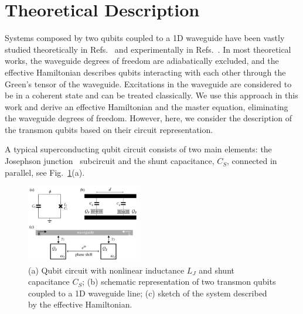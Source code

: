 \documentclass[lettersize,journal]{IEEEtran}
\begin{document}
\section{Theoretical Description}
\noindent Systems composed by two qubits coupled to a 1D waveguide have been vastly studied theoretically in Refs.~\cite{muller_nonreciprocal_2017, dai_rectification_2015, Nefedkin2022, trivedi_fano-qubits_2023, lalumiere_input-output_2013} and experimentally in Refs.~\cite{rosario_hamann_nonreciprocity_2018}. 
In most theoretical works, the waveguide degrees of freedom are adiabatically excluded, and the effective Hamiltonian describes qubits interacting with each other through the Green's tensor of the waveguide.
Excitations in the waveguide are considered to be in a coherent state and can be treated classically.
We use this approach in this work and derive an effective Hamiltonian and the master equation, eliminating the waveguide degrees of freedom.
However, here, we consider the description of the transmon qubits based on their circuit representation.

A typical superconducting qubit circuit consists of two main elements: the Josephson junction~\cite{Josephson1962Possible} subcircuit and the shunt capacitance, $C_S$, connected in parallel, see Fig.~\ref{fig:01}(a). 

\begin{figure}[h]
    \centering
    \includegraphics[width=0.45\textwidth]{fig_1}
    \caption{(a) Qubit circuit with nonlinear inductance $L_J$ and shunt capacitance $C_S$; (b) schematic representation of two transmon qubits coupled to a 1D waveguide line; (c) sketch of the system described by the effective Hamiltonian.}
    \label{fig:01}
\end{figure}
\end{document}
